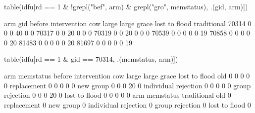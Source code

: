 \begin{Schunk}
\begin{Sinput}
table(idfu[rd == 1 & !grepl("bef", arm) & grepl("gro", memstatus), .(gid, arm)])
\end{Sinput}
\begin{Soutput}
       arm
gid     before intervention cow large large grace lost to flood traditional
  70314                   0   0     0          40             0           0
  70317                   0   0    20           0             0           0
  70319                   0   0    20           0             0           0
  70539                   0   0     0           0             0          19
  70858                   0   0     0           0             0          20
  81483                   0   0     0           0             0          20
  81697                   0   0     0           0             0          19
\end{Soutput}
\begin{Sinput}
table(idfu[rd == 1 & gid == 70314, .(memstatus, arm)])
\end{Sinput}
\begin{Soutput}
                      arm
memstatus              before intervention cow large large grace lost to flood
  old                                    0   0     0           0             0
  replacement                            0   0     0           0             0
  new group                              0   0     0          20             0
  individual rejection                   0   0     0           0             0
  group rejection                        0   0     0          20             0
  lost to flood                          0   0     0           0             0
                      arm
memstatus              traditional
  old                            0
  replacement                    0
  new group                      0
  individual rejection           0
  group rejection                0
  lost to flood                  0
\end{Soutput}
\end{Schunk}

